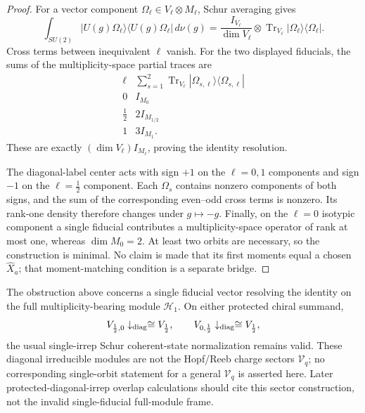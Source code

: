 \documentclass[11pt,a4paper]{article}
\begin{document}
\begin{proof}
For a vector component
\(\Omega_{\ell}\in V_\ell\otimes M_\ell\), Schur averaging gives
\[
\int_{SU(2)}
|U(g)\Omega_{\ell}\rangle\langle U(g)\Omega_{\ell}|\,d\nu(g)
=
\frac{I_{V_\ell}}{\dim V_\ell}
\otimes
\operatorname{Tr}_{V_\ell}
|\Omega_{\ell}\rangle\langle\Omega_{\ell}|.
\]
Cross terms between inequivalent \(\ell\) vanish.  For the two displayed
fiducials, the sums of the multiplicity-space partial traces are
\[
\begin{array}{c|c}
\ell & \displaystyle
\sum_{s=1}^{2}\operatorname{Tr}_{V_\ell}
|\Omega_{s,\ell}\rangle\langle\Omega_{s,\ell}|\\
\hline
0 & I_{M_0}\\
\tfrac12 & 2I_{M_{1/2}}\\
1 & 3I_{M_1}.
\end{array}
\]
These are exactly
\((\dim V_\ell)I_{M_\ell}\), proving the identity resolution.

The diagonal-label center acts with sign \(+1\) on the \(\ell=0,1\) components and sign
\(-1\) on the \(\ell=\tfrac12\) component.  Each \(\Omega_s\) contains
nonzero components of both signs, and the sum of the corresponding
even--odd cross terms is nonzero.  Its rank-one density therefore changes
under \(g\mapsto-g\).  Finally, on the \(\ell=0\) isotypic component a
single fiducial contributes a multiplicity-space operator of rank at most
one, whereas \(\dim M_0=2\).  At least two orbits are necessary, so the
construction is minimal.  No claim is made that its first moments equal a
chosen \(\widehat X_a\); that moment-matching condition is a separate bridge.
\end{proof}

\begin{remark}
\label{p2:rem:protected-sector-coherent-projections}
The obstruction above concerns a single fiducial vector resolving the identity
on the full multiplicity-bearing module \(\mathcal H_1\).  On either protected
chiral summand,
\[
V_{\frac12,0}\downarrow_{\rm diag}\cong V_{\frac12},
\qquad
V_{0,\frac12}\downarrow_{\rm diag}\cong V_{\frac12},
\]
the usual single-irrep Schur coherent-state normalization remains valid.
These diagonal irreducible modules are not the Hopf/Reeb charge sectors
\(\mathcal V_q\); no corresponding single-orbit statement for a general
\(\mathcal V_q\) is asserted here.  Later protected-diagonal-irrep overlap
calculations should cite this sector construction, not the invalid
single-fiducial full-module frame.
\end{remark}
\end{document}
